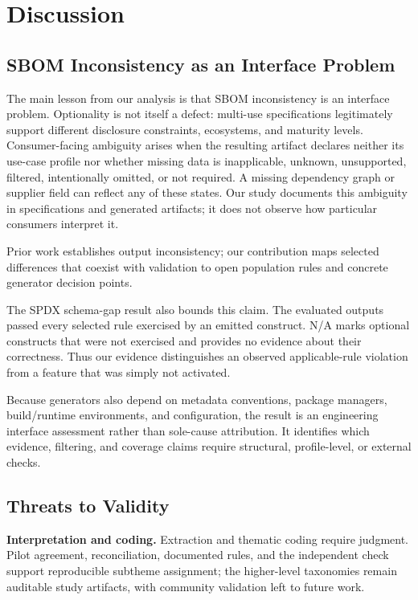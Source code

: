 \section{Discussion}
\label{sec:discussion}

\subsection{SBOM Inconsistency as an Interface Problem}
The main lesson from our analysis is that SBOM inconsistency is an interface problem. Optionality is not itself a defect: multi-use specifications legitimately support different disclosure constraints, ecosystems, and maturity levels. Consumer-facing ambiguity arises when the resulting artifact declares neither its use-case profile nor whether missing data is inapplicable, unknown, unsupported, filtered, intentionally omitted, or not required. A missing dependency graph or supplier field can reflect any of these states. Our study documents this ambiguity in specifications and generated artifacts; it does not observe how particular consumers interpret it.

Prior work establishes output inconsistency; our contribution maps selected differences that coexist with validation to open population rules and concrete generator decision points.

The SPDX schema-gap result also bounds this claim. The evaluated outputs passed every selected rule exercised by an emitted construct. N/A marks optional constructs that were not exercised and provides no evidence about their correctness. Thus our evidence distinguishes an observed applicable-rule violation from a feature that was simply not activated.

Because generators also depend on metadata conventions, package managers, build/runtime environments, and configuration, the result is an engineering interface assessment rather than sole-cause attribution. It identifies which evidence, filtering, and coverage claims require structural, profile-level, or external checks.

\subsection{Threats to Validity}
\textbf{Interpretation and coding.} Extraction and thematic coding require judgment. Pilot agreement, reconciliation, documented rules, and the independent check support reproducible subtheme assignment; the higher-level taxonomies remain auditable study artifacts, with community validation left to future work.

